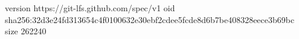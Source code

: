 version https://git-lfs.github.com/spec/v1
oid sha256:32d3e24fd313654c4f0100632e30ebf2cdee5fcde8d6b7be408328eece3b69bc
size 262240
